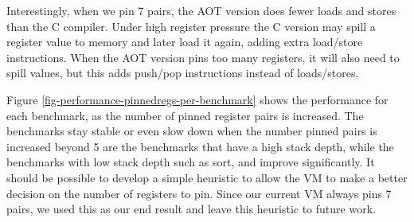 Interestingly, when we pin 7 pairs, the AOT version does fewer loads and stores than the C compiler. Under high register pressure the C version may spill a register value to memory and later load it again, adding extra load/store instructions. When the AOT version pins too many registers, it will also need to spill values, but this adds push/pop instructions instead of loads/stores.

Figure \ref{fig-performance-pinnedregs-per-benchmark} shows the performance for each benchmark, as the number of pinned register pairs is increased. The benchmarks stay stable or even slow down when the number pinned pairs is increased beyond 5 are the benchmarks that have a high stack depth, while the benchmarks with low stack depth such as sort,  and  improve significantly. It should be possible to develop a simple heuristic to allow the VM to make a better decision on the number of registers to pin. Since our current VM always pins 7 pairs, we used this as our end result and leave this heuristic to future work.


